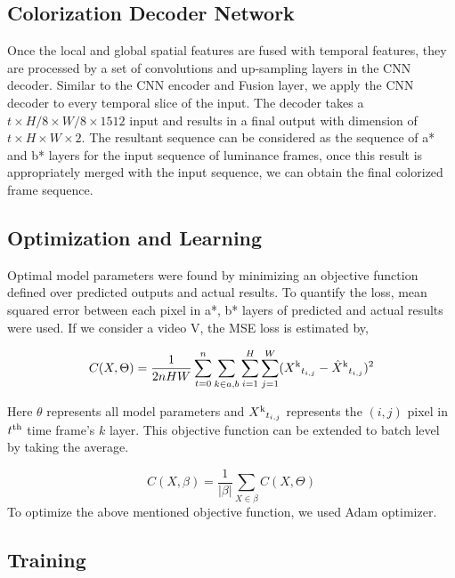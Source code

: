 \documentclass[10pt,twocolumn,letterpaper]{article}
\begin{document}
\subsection{Colorization Decoder Network}
Once the local and global spatial features are fused with temporal features, they are processed by a set of convolutions and up-sampling layers in the CNN decoder. Similar to the CNN encoder and Fusion layer, we apply the CNN decoder to every temporal slice of the input. The decoder takes a $t\times H/8\times W/8\times 1512$ input and results in a final output with dimension of $t\times H\times W\times 2$. The resultant sequence can be considered as the sequence of a* and b* layers for the input sequence of luminance frames, once this result is appropriately merged with the input sequence, we can obtain the final colorized frame sequence.

\subsection{Optimization and Learning}
Optimal model parameters were found by minimizing an objective function defined over predicted outputs and actual results. To quantify the loss, mean squared error between each pixel in a*, b* layers of predicted and actual results were used. If we consider a video V, the MSE loss is estimated by,

\begin{equation}
\small
C(X,\Theta ) = \frac{1}{2nHW}\sum_{t=0}^{n}\sum_{k\in {a,b}}\sum_{i=1}^{H}\sum_{j=1}^{W} (X\textsuperscript{k}_{t_{i,j}} - \hat{X}\textsuperscript{k}_{t_{i,j}}) ^ 2
\end{equation}

Here $\theta$ represents all model parameters and $X\textsuperscript{k}_{t_{i,j}}$ represents the $(i,j)$ pixel in $t\textsuperscript{th}$ time frame's $k$ layer. This objective function can be extended to batch level by taking the average. 

\begin{equation}
C(X,\beta) = \frac{1}{\left | \beta  \right |}\sum_{X\in {\beta}} C(X,\Theta)
\end{equation}
To optimize the above mentioned objective function, we used Adam optimizer. \cite{DBLP:journals/corr/KingmaB14}

\subsection{Training}
\end{document}
